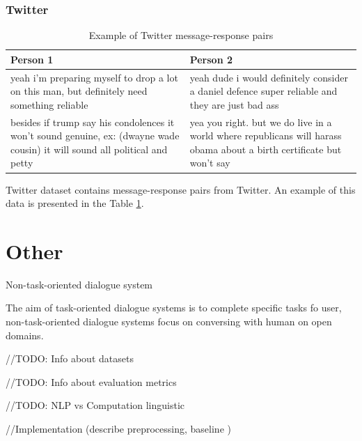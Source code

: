 \subsection{Twitter}
\begin{table}[ht]
\centering
 \begin{tabular}{|p{7cm}|p{7cm}|} 
 \hline\hline
 \textbf{Person 1} & \textbf{Person 2} \\
 \hline\hline
 yeah i'm preparing myself to drop a lot on this man, but definitely need something reliable & yeah dude i would definitely consider a daniel defence super reliable and they are just bad ass \\ 
 \hline
 besides if trump say his condolences it won't sound genuine, ex: (dwayne wade cousin) it will sound all political and petty & yea you right. but we do live in a world where republicans will harass obama about a birth certificate but won't say \\
 \hline\hline
 \end{tabular}
 \caption{Example of Twitter message-response pairs}
\label{tab:twitter_chat}
\end{table}

Twitter dataset contains message-response pairs from Twitter. An example of this data is presented in the Table \ref{tab:twitter_chat}. 



\chapter{Other}

Non-task-oriented dialogue system

The aim of task-oriented dialogue systems is to complete specific tasks fo user, non-task-oriented dialogue systems focus on conversing with human on open domains. 

//TODO: Info about datasets

//TODO: Info about evaluation metrics

//TODO: NLP vs Computation linguistic

//Implementation (describe preprocessing, baseline )
